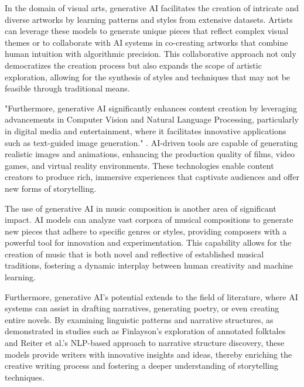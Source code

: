 In the domain of visual arts, generative AI facilitates the creation of intricate and diverse artworks by learning patterns and styles from extensive datasets. Artists can leverage these models to generate unique pieces that reflect complex visual themes or to collaborate with AI systems in co-creating artworks that combine human intuition with algorithmic precision. This collaborative approach not only democratizes the creation process but also expands the scope of artistic exploration, allowing for the synthesis of styles and techniques that may not be feasible through traditional means.



"Furthermore, generative AI significantly enhances content creation by leveraging advancements in Computer Vision and Natural Language Processing, particularly in digital media and entertainment, where it facilitates innovative applications such as text-guided image generation." \cite{palmini2024patternscreativityuserinput}. AI-driven tools are capable of generating realistic images and animations, enhancing the production quality of films, video games, and virtual reality environments. These technologies enable content creators to produce rich, immersive experiences that captivate audiences and offer new forms of storytelling.



The use of generative AI in music composition is another area of significant impact. AI models can analyze vast corpora of musical compositions to generate new pieces that adhere to specific genres or styles, providing composers with a powerful tool for innovation and experimentation. This capability allows for the creation of music that is both novel and reflective of established musical traditions, fostering a dynamic interplay between human creativity and machine learning.



Furthermore, generative AI's potential extends to the field of literature, where AI systems can assist in drafting narratives, generating poetry, or even creating entire novels. By examining linguistic patterns and narrative structures, as demonstrated in studies such as Finlayson's exploration of annotated folktales and Reiter et al.'s NLP-based approach to narrative structure discovery, these models provide writers with innovative insights and ideas, thereby enriching the creative writing process and fostering a deeper understanding of storytelling techniques. \cite{jannidis2016analyzingfeaturesdetectionhappy}



